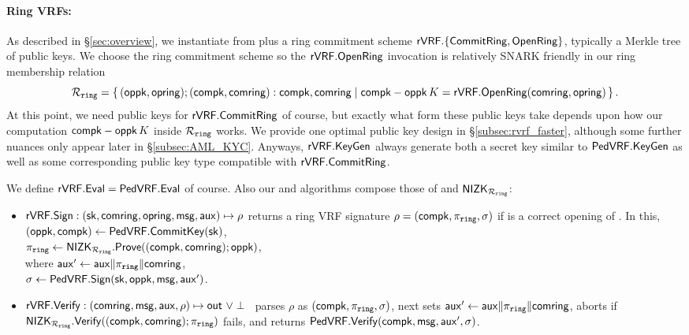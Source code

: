 \paragraph{Ring VRFs:}
As described in \S\ref{sec:overview},
we instantiate \rVRF from \PedVRF plus a ring commitment scheme
 ${\mathsf{rVRF}}.\{ {\mathsf{CommitRing}}, {\mathsf{OpenRing}} \}$,
typically a Merkle tree of public keys.
We choose the ring commitment scheme so the ${\mathsf{rVRF}}.{\mathsf{OpenRing}}$ invocation
is relatively SNARK friendly in our ring membership relation
$$ \Rring = \Setst{ (\openpk,\openring); (\compk, \comring): \compk, \comring }{
	\compk - \openpk \, \genB = \rVRF.\OpenRing(\comring,\openring)
} \mathperiod $$
At this point, we need public keys for ${\mathsf{rVRF}}.{\mathsf{CommitRing}}$ of course,
but exactly what form these public keys take depends upon how our computation
 $\mathsf{compk} - \mathsf{oppk} \, K$ inside $\mathcal{R}_{\mathtt{ring}}$ works.
We provide one optimal public key design in \S\ref{subsec:rvrf_faster},
 although some further nuances only appear later in \S\ref{subsec:AML_KYC}.
Anyways, ${\mathsf{rVRF}}.{\mathsf{KeyGen}}$ always generate both a secret key similar to
${\mathsf{PedVRF}}.{\mathsf{KeyGen}}$ as well as some corresponding public key type
 compatible with ${\mathsf{rVRF}}.{\mathsf{CommitRing}}$.

We define ${\mathsf{rVRF}}.{\mathsf{Eval}} = {\mathsf{PedVRF}}.{\mathsf{Eval}}$ of course.
Also our \Sign and \Verify algorithms compose those of \PedVRF and
 ${\mathsf{NIZK}}_{\mathcal{R}_{\mathtt{ring}}}$:
\def\tmpaux{\aux \doubleplus \piring \doubleplus \comring}
\def\tmpeprintaux{\eprint{\aux'}{\tmpaux}}
\def\tmpindent{\hspace*{5pt}}
\begin{itemize}
	\item ${\mathsf{rVRF}}.{\mathsf{Sign}} : (\mathsf{sk},\mathsf{comring}, \mathsf{opring},\mathsf{msg},\mathsf{aux}) \mapsto \rho$
	returns a ring VRF signature $\rho = (\mathsf{compk},\pi_{\mathtt{ring}},\sigma)$
	if \openring is a correct opening of \comring.  In this, 
	\tmpindent $(\mathsf{oppk},\mathsf{compk}) \leftarrow {\ensuremath{\mathsf{PedVRF}}}.{\mathsf{CommitKey}}(\mathsf{sk})$,  \\
	\tmpindent $\pi_{\mathtt{ring}} \leftarrow {\ensuremath{\mathsf{NIZK}}}_{\mathcal{R}_{\mathtt{ring}}}.{\mathsf{Prove}}((\mathsf{compk},\mathsf{comring}); \mathsf{oppk})$, \\
	where 
	\tmpindent $\aux' \leftarrow \tmpaux$,  \\
	\tmpindent $\sigma \leftarrow {\ensuremath{\mathsf{PedVRF}}}.{\mathsf{Sign}}(\mathsf{sk},\mathsf{oppk},\mathsf{msg}, \mathsf{aux}')$.

	\item ${\mathsf{rVRF}}.{\mathsf{Verify}} : (\mathsf{comring},\mathsf{msg},\mathsf{aux},\rho) \mapsto {\ensuremath{\mathsf{out}}} \,\, \lor \perp$ \,
	parses $\rho$ as $(\mathsf{compk},\pi_{\mathtt{ring}},\sigma)$, next sets $\aux' \leftarrow \tmpaux$,
	aborts if ${\mathsf{NIZK}}_{\mathcal{R}_{\mathtt{ring}}}.{\mathsf{Verify}}((\mathsf{compk},\mathsf{comring}); \pi_{\mathtt{ring}})$ fails,
	and returns ${\mathsf{PedVRF}}.{\mathsf{Verify}}(\mathsf{compk},\mathsf{msg}, \mathsf{aux}', \sigma)$.
\end{itemize}


